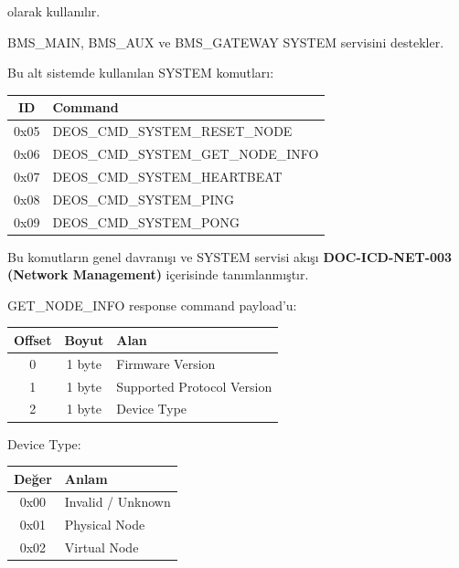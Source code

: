 \documentclass[a4paper,10pt]{article}
\begin{document}
olarak kullanılır.

BMS\_MAIN, BMS\_AUX ve BMS\_GATEWAY SYSTEM servisini destekler.

Bu alt sistemde kullanılan SYSTEM komutları:

\begin{center}
\begin{tabular}{c l}
\toprule
\textbf{ID} & \textbf{Command} \\
\midrule

0x05 & DEOS\_CMD\_SYSTEM\_RESET\_NODE \\
0x06 & DEOS\_CMD\_SYSTEM\_GET\_NODE\_INFO \\
0x07 & DEOS\_CMD\_SYSTEM\_HEARTBEAT \\
0x08 & DEOS\_CMD\_SYSTEM\_PING \\
0x09 & DEOS\_CMD\_SYSTEM\_PONG \\

\bottomrule
\end{tabular}
\end{center}

Bu komutların genel davranışı ve SYSTEM servisi akışı \textbf{DOC-ICD-NET-003 (Network Management)} içerisinde tanımlanmıştır.

GET\_NODE\_INFO response command payload'u:

\begin{center}
\begin{tabular}{c c l}
\toprule
\textbf{Offset} & \textbf{Boyut} & \textbf{Alan} \\
\midrule

0 & 1 byte & Firmware Version \\
1 & 1 byte & Supported Protocol Version \\
2 & 1 byte & Device Type \\

\bottomrule
\end{tabular}
\end{center}

Device Type:

\begin{center}
\begin{tabular}{c l}
\toprule
\textbf{Değer} & \textbf{Anlam} \\
\midrule
0x00 & Invalid / Unknown \\
0x01 & Physical Node \\
0x02 & Virtual Node \\
\bottomrule
\end{tabular}
\end{center}
\end{document}
